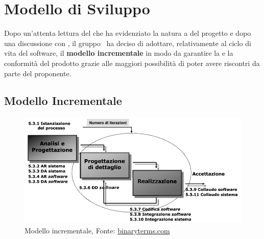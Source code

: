 \section{Modello di Sviluppo}
\label{modello_di_sviluppo}
Dopo un'attenta lettura del  che ha evidenziato la natura a  del progetto e dopo una discussione con \Proponente, il gruppo \Gruppo\ ha deciso di adottare, relativamente al ciclo di vita del software, il \textbf{modello incrementale} in modo da garantire la  e la conformità del prodotto grazie alle maggiori possibilità di poter avere riscontri da parte del proponente. 

\subsection{Modello Incrementale}
\begin{figure}[ht]
    \centering
    \includegraphics[width=\textwidth]{Immagini/ModelloIncrementale}
    \caption{Modello incrementale, Fonte: \href{https://binaryterms.com/incremental-development-model.html}{binaryterms.com}}
    \label{fig:modello_incrementale}
\end{figure}

